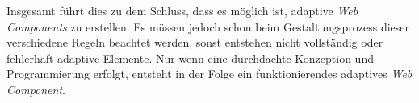 \documentclass[12pt, paper=a4, bibtotoc, toc=listof, headsepline=true]{scrreprt}
\begin{document}
\newline
Insgesamt führt dies zu dem Schluss, dass es möglich ist, adaptive \emph{Web Components} zu erstellen. Es müssen jedoch schon beim Gestaltungsprozess dieser verschiedene Regeln beachtet werden, sonst entstehen nicht vollständig oder fehlerhaft adaptive Elemente. Nur wenn eine durchdachte Konzeption und Programmierung erfolgt, entsteht in der Folge ein funktionierendes adaptives \emph{Web Component}.

	\printbibliography
\end{document}
